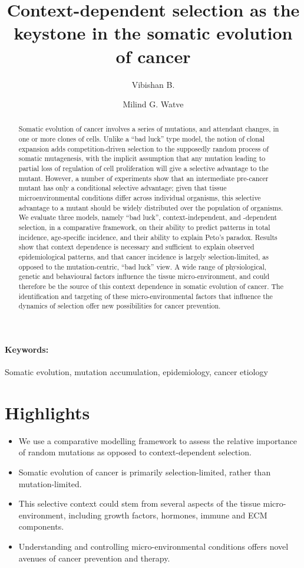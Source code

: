 \documentclass[12pt,onecolumn,twoside]{article}
\author[1]{Vibishan B.}
\author[1,*]{Milind G. Watve}
\affil[1]{Department of Biology, Indian Institute of Science Education and Research (IISER), Pune}
\affil[*]{Corresponding author: milind@iiserpune.ac.in}
\title{Context-dependent selection as the keystone in the somatic evolution of cancer}
\begin{document}
\maketitle
\begin{abstract}
	Somatic evolution of cancer involves a series of mutations, and attendant changes, in one or more clones of cells. Unlike a ``bad luck'' type model, the notion of clonal expansion adds competition-driven selection to the supposedly random process of somatic mutagenesis, with the implicit assumption that any mutation leading to partial loss of regulation of cell proliferation will give a selective advantage to the mutant. However, a number of experiments show that an intermediate pre-cancer mutant has only a conditional selective advantage; given that tissue microenvironmental conditions differ across individual organisms, this selective advantage to a mutant should be widely distributed over the population of organisms. We evaluate three models, namely ``bad luck'', context-independent, and -dependent selection, in a comparative framework, on their ability to predict patterns in total incidence, age-specific incidence, and their ability to explain Peto’s paradox. Results show that context dependence is necessary and sufficient to explain observed epidemiological patterns, and that cancer incidence is largely selection-limited, as opposed to the mutation-centric, ``bad luck'' view. A wide range of physiological, genetic and behavioural factors influence the tissue micro-environment, and could therefore be the source of this context dependence in somatic evolution of cancer. The identification and targeting of these micro-environmental factors that influence the dynamics of selection offer new possibilities for cancer prevention.
\end{abstract}

\paragraph{Keywords:} Somatic evolution, mutation accumulation, epidemiology, cancer etiology
\pagebreak

\section*{Highlights}
	\begin{itemize}
	\item We use a comparative modelling framework to assess the relative importance of random mutations as opposed to context-dependent selection.
	\item Somatic evolution of cancer is primarily selection-limited, rather than mutation-limited.
	\item This selective context could stem from several aspects of the tissue micro-environment, including growth factors, hormones, immune and ECM components.
	\item Understanding and controlling micro-environmental conditions offers novel avenues of cancer prevention and therapy.
	\end{itemize}
\end{document}
